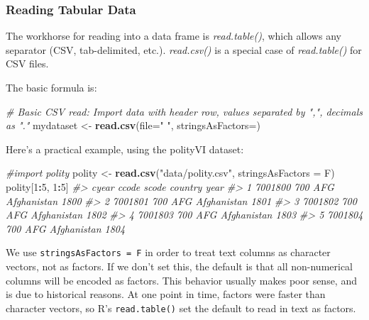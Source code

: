 \documentclass[]{book}
\newenvironment{Shaded}{\begin{snugshade}}{\end{snugshade}}
\newcommand{\CommentTok}[1]{\textcolor[rgb]{0.56,0.35,0.01}{\textit{#1}}}
\newcommand{\DataTypeTok}[1]{\textcolor[rgb]{0.13,0.29,0.53}{#1}}
\newcommand{\DecValTok}[1]{\textcolor[rgb]{0.00,0.00,0.81}{#1}}
\newcommand{\KeywordTok}[1]{\textcolor[rgb]{0.13,0.29,0.53}{\textbf{#1}}}
\newcommand{\NormalTok}[1]{#1}
\newcommand{\OperatorTok}[1]{\textcolor[rgb]{0.81,0.36,0.00}{\textbf{#1}}}
\newcommand{\StringTok}[1]{\textcolor[rgb]{0.31,0.60,0.02}{#1}}
\begin{document}
\hypertarget{reading-tabular-data}{%
\subsubsection*{Reading Tabular Data}\label{reading-tabular-data}}

The workhorse for reading into a data frame is \emph{read.table()}, which allows any separator (CSV, tab-delimited, etc.). \emph{read.csv()} is a special case of \emph{read.table()} for CSV files.

The basic formula is:

\begin{Shaded}
\begin{Highlighting}[]
\CommentTok{# Basic CSV read: Import data with header row, values separated by ",", decimals as "."}
\NormalTok{mydataset <-}\StringTok{ }\KeywordTok{read.csv}\NormalTok{(}\DataTypeTok{file=}\StringTok{"  "}\NormalTok{, }\DataTypeTok{stringsAsFactors=}\NormalTok{)}
\end{Highlighting}
\end{Shaded}

Here's a practical example, using the polityVI dataset:

\begin{Shaded}
\begin{Highlighting}[]
\CommentTok{#import polity}
\NormalTok{polity <-}\StringTok{ }\KeywordTok{read.csv}\NormalTok{(}\StringTok{"data/polity.csv"}\NormalTok{, }\DataTypeTok{stringsAsFactors =}\NormalTok{ F)}
\NormalTok{polity[}\DecValTok{1}\OperatorTok{:}\DecValTok{5}\NormalTok{, }\DecValTok{1}\OperatorTok{:}\DecValTok{5}\NormalTok{]}
\CommentTok{#>     cyear ccode scode     country year}
\CommentTok{#> 1 7001800   700   AFG Afghanistan 1800}
\CommentTok{#> 2 7001801   700   AFG Afghanistan 1801}
\CommentTok{#> 3 7001802   700   AFG Afghanistan 1802}
\CommentTok{#> 4 7001803   700   AFG Afghanistan 1803}
\CommentTok{#> 5 7001804   700   AFG Afghanistan 1804}
\end{Highlighting}
\end{Shaded}

We use \texttt{stringsAsFactors\ =\ F} in order to treat text columns as character vectors, not as factors. If we don't set this, the default is that all non-numerical columns will be encoded as factors. This behavior usually makes poor sense, and is due to historical reasons. At one point in time, factors were faster than character vectors, so R's \texttt{read.table()} set the default to read in text as factors.
\end{document}
